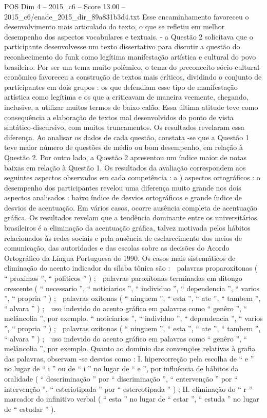 \begin{textsample}{POS Dim 4 – 2015\_c6 – Score 13.00 – 2015\_c6/enade\_2015\_dir\_89a831b3d4.txt}
Esse encaminhamento favoreceu o desenvolvimento mais articulado do texto, o que se refletiu em melhor desempenho dos aspectos vocabulares e textuais. - a Questão 2 solicitava que o participante desenvolvesse um texto dissertativo para discutir a questão do reconhecimento do funk como legítima manifestação artística e cultural do povo brasileiro.
Por ser um tema muito polêmico, o tema do preconceito sócio-cultural-econômico favoreceu a construção de textos mais críticos, dividindo o conjunto de participantes em dois grupos : os que defendiam esse tipo de manifestação artística como legítima e os que a criticavam de maneira veemente, chegando, inclusive, a utilizar muitos termos de baixo calão.
Essa última atitude teve como consequência a elaboração de textos mal desenvolvidos do ponto de vista sintático-discursivo, com muitos truncamentos.
Os resultados revelaram essa diferença.
Ao analisar os dados de cada questão, constata -se que a Questão 1 teve maior número de questões de médio ou bom desempenho, em relação à Questão 2.
Por outro lado, a Questão 2 apresentou um índice maior de notas baixas em relação à Questão 1.
Os resultados da avaliação correspondem aos seguintes aspectos observados em cada competência : a ) aspectos ortográficos : o desempenho dos participantes revelou uma diferença muito grande nos dois aspectos analisados : baixo índice de desvios ortográficos e grande índice de desvios de acentuação.
Em vários casos, ocorre ausência completa de acentuação gráfica.
Os resultados revelam que a tendência dominante entre os universitários brasileiros é a eliminação da acentuação gráfica, talvez motivada pelos hábitos relacionados às redes sociais e pela ausência de esclarecimento dos meios de comunicação, das autoridades e das escolas sobre as decisões do Acordo Ortográfico da Língua Portuguesa de 1990.
Os casos mais sistemáticos de eliminação do acento indicador da sílaba tônica são :  palavras proparoxítonas ( “ proximos ”, “ politicos ” ) ;  palavras paroxítonas terminadas em ditongo crescente ( “ necessario ”, “ noticiarios ”, “ individuo ”, “ dependencia ”, “ varios ”, “ propria ” ) ;  palavras oxítonas ( “ ninguem ”, “ esta ”, “ ate ”, “ tambem ”, “ alvara ” ) ;  uso indevido do acento gráfico em palavras como “ genêro ”, “ melâncolia ”, por exemplo. “ noticiarios ”, “ individuo ”, “ dependencia ”, “ varios ”, “ propria ” ) ;  palavras oxítonas ( “ ninguem ”, “ esta ”, “ ate ”, “ tambem ”, “ alvara ” ) ;  uso indevido do acento gráfico em palavras como “ genêro ”, “ melâncolia ”, por exemplo.
Quanto ao domínio das convenções relativas à grafia das palavras, observam -se desvios como : I. hipercorreção pela escolha de “ e ” no lugar de “ i ” ou de “ i ” no lugar de “ e ”, por influência de hábitos da oralidade ( “ descriminação ” por “ discriminação ”, “ entervenção ” por “ intervenção ”, “ esteriotipada ” por “ estereotipada ” ) ; II. eliminação do “ r ” marcador do infinitivo verbal ( “ esta ” no lugar de “ estar ”, “ estuda ” no lugar de “ estudar ” ).

\end{textsample}
